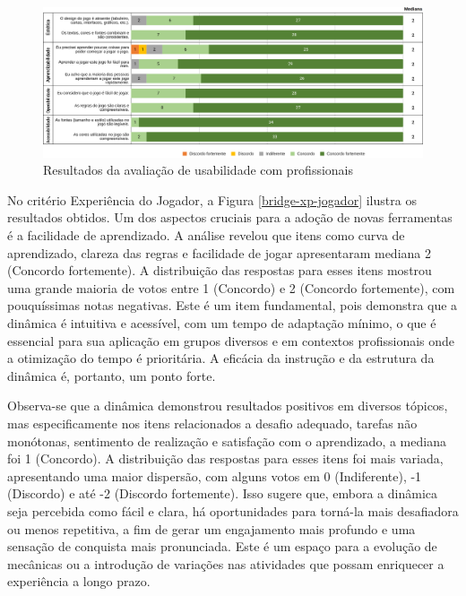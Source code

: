 \documentclass[
	12pt,
	openright,
	twoside,
	a4paper,
	english,
	brazil
	]{abntex2}
\begin{document}
\begin{figure}[H]
	\caption{\label{bridge-usabilidade} Resultados da avaliação de usabilidade com profissionais}
  \includegraphics[width=\textwidth]{bridge-usabilidade}
\end{figure}


No critério Experiência do Jogador, a Figura \ref{bridge-xp-jogador} ilustra os resultados obtidos. Um dos aspectos cruciais para a adoção de novas ferramentas é a facilidade de aprendizado. A análise revelou que itens como curva de aprendizado, clareza das regras e facilidade de jogar apresentaram mediana 2 (Concordo fortemente). A distribuição das respostas para esses itens mostrou uma grande maioria de votos entre 1 (Concordo) e 2 (Concordo fortemente), com pouquíssimas notas negativas. Este é um item fundamental, pois demonstra que a dinâmica é intuitiva e acessível, com um tempo de adaptação mínimo, o que é essencial para sua aplicação em grupos diversos e em contextos profissionais onde a otimização do tempo é prioritária. A eficácia da instrução e da estrutura da dinâmica é, portanto, um ponto forte.

Observa-se que a dinâmica demonstrou resultados positivos em diversos tópicos, mas especificamente nos itens relacionados a desafio adequado, tarefas não monótonas, sentimento de realização e satisfação com o aprendizado, a mediana foi 1 (Concordo). A distribuição das respostas para esses itens foi mais variada, apresentando uma maior dispersão, com alguns votos em 0 (Indiferente), -1 (Discordo) e até -2 (Discordo fortemente). Isso sugere que, embora a dinâmica seja percebida como fácil e clara, há oportunidades para torná-la mais desafiadora ou menos repetitiva, a fim de gerar um engajamento mais profundo e uma sensação de conquista mais pronunciada. Este é um espaço para a evolução de mecânicas ou a introdução de variações nas atividades que possam enriquecer a experiência a longo prazo.
\end{document}
